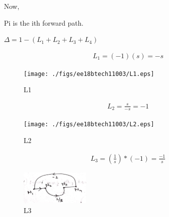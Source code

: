 \begin{enumerate}[label=\thesection.\arabic*.,ref=\thesection.\theenumi]



Now, 

Pi is the ith forward path.


$\Delta = 1-(L_1 + L_2 + L_3 + L_4)$

\begin{align}
L_1=(-1)(s)=-s
\end{align}

\begin{figure}[!ht]
\centering
\texttt{[image: ./figs/ee18btech11003/L1.eps]}
\caption{L1}
\label{fig:sec_order}
\end{figure}


\begin{align}
L_2=\frac{s}{-s}=-1
\end{align}

\begin{figure}[!ht]
\centering
\texttt{[image: ./figs/ee18btech11003/L2.eps]}
\caption{L2}
\label{fig:sec_order}
\end{figure}


\begin{align}
L_3=(\frac{1}{s})*(-1)=\frac{-1}{s}
\end{align}

\begin{figure}[!ht]
\centering
\includegraphics[width=0.3\textwidth]{./figs/ee18btech11003/L3.eps}
\caption{L3}
\label{fig:sec_order}
\end{figure}



\end{enumerate}
